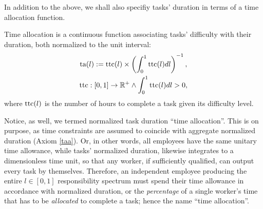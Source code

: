 \documentclass[hidelinks, nonatbib]{elsarticle}
\begin{document}
In addition to the above, we shall also specifiy tasks' duration in terms of a time allocation function.
\begin{definition}
    \label{ta}
    Time allocation is a continuous function associating tasks' difficulty with their duration, both normalized to the unit interval:
    \begin{gather}
        \text{ta}(l)
        :=
        \text{ttc}(l)
        \times
        \left(
            \int_{0}^{1}
            \text{ttc}(l)
            dl
        \right) ^ {-1}
        ,
        \\
        \text{ttc}
        :
        [0,1]
        \rightarrow
        \mathbb{R}^{+}        
        \land
        \int_{0}^{1}
            \text{ttc}(l)
            dl
            >
            0
        ,
    \end{gather}
    where $\text{ttc}(l)$ is the number of hours to complete a task given its difficulty level.
    
    Notice, as well, we termed normalized task duration ``time allocation''. This is on purpose, as time constraints are assumed to coincide with aggregate normalized duration (Axiom \ref{taa}). Or, in other words, all employees have the same unitary time allowance, while tasks' normalized duration, likewise integrates to a dimensionless time unit, so that any worker, if sufficiently qualified, can output every task by themselves. Therefore, an independent employee producing the entire $l \in [0,1]$ responsibility spectrum must spend their time allowance in accordance with normalized duration, or the \textit{percentage} of a single worker's time that has to be \textit{allocated} to complete a task; hence the name ``time allocation''.
\end{definition}
\end{document}
